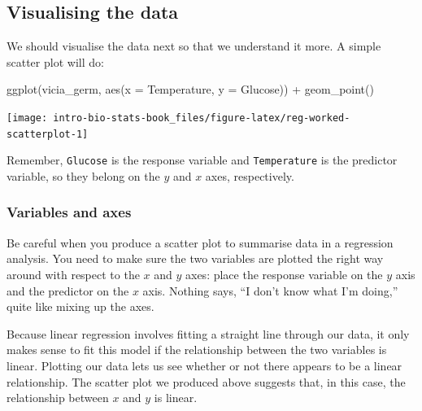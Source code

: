\documentclass[
]{book}
\newenvironment{Shaded}{\begin{snugshade}}{\end{snugshade}}
\newcommand{\AttributeTok}[1]{\textcolor[rgb]{0.77,0.63,0.00}{#1}}
\newcommand{\FunctionTok}[1]{\textcolor[rgb]{0.00,0.00,0.00}{#1}}
\newcommand{\NormalTok}[1]{#1}
\newcommand{\SpecialCharTok}[1]{\textcolor[rgb]{0.00,0.00,0.00}{#1}}
\newenvironment{greybox}{
  \definecolor{shadecolor}{rgb}{0.95,0.95,0.95}  %
  \color{black}
  \begin{shaded}}
 {\end{shaded}}
\newenvironment{infobox}[1]
  {
  \begin{itemize}
  \renewcommand{\labelitemi}{
    \raisebox{-.7\height}[0pt][0pt]{
      {\setkeys{Gin}{width=3em,keepaspectratio}
        \texttt{[image: images/\#1]}}
    }
  }
  \setlength{\fboxsep}{1em}
  \begin{greybox}
  \item
  }
  {
  \end{greybox}
  \end{itemize}
  }
\begin{document}
\hypertarget{visualising-the-data}{%
\subsection{Visualising the data}\label{visualising-the-data}}

We should visualise the data next so that we understand it more. A simple scatter plot will do:

\begin{Shaded}
\begin{Highlighting}[]
\FunctionTok{ggplot}\NormalTok{(vicia\_germ, }\FunctionTok{aes}\NormalTok{(}\AttributeTok{x =}\NormalTok{ Temperature, }\AttributeTok{y =}\NormalTok{ Glucose)) }\SpecialCharTok{+} 
  \FunctionTok{geom\_point}\NormalTok{()}
\end{Highlighting}
\end{Shaded}

\begin{center}\texttt{[image: intro-bio-stats-book\_files/figure-latex/reg-worked-scatterplot-1]} \end{center}

Remember, \texttt{Glucose} is the response variable and \texttt{Temperature} is the predictor variable, so they belong on the \(y\) and \(x\) axes, respectively.

\begin{infobox}{warning}

\hypertarget{variables-and-axes}{%
\subsubsection*{Variables and axes}\label{variables-and-axes}}

Be careful when you produce a scatter plot to summarise data in a regression analysis. You need to make sure the two variables are plotted the right way around with respect to the \(x\) and \(y\) axes: place the response variable on the \(y\) axis and the predictor on the \(x\) axis. Nothing says, ``I don't know what I'm doing,'' quite like mixing up the axes.

\end{infobox}

Because linear regression involves fitting a straight line through our data, it only makes sense to fit this model if the relationship between the two variables is linear. Plotting our data lets us see whether or not there appears to be a linear relationship. The scatter plot we produced above suggests that, in this case, the relationship between \(x\) and \(y\) is linear.
\end{document}
